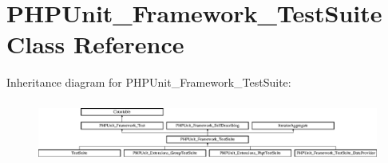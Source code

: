 \hypertarget{class_p_h_p_unit___framework___test_suite}{}\section{P\+H\+P\+Unit\+\_\+\+Framework\+\_\+\+Test\+Suite Class Reference}
\label{class_p_h_p_unit___framework___test_suite}
Inheritance diagram for P\+H\+P\+Unit\+\_\+\+Framework\+\_\+\+Test\+Suite\+:\begin{figure}[H]
\begin{center}
\leavevmode
\includegraphics[height=2.028986cm]{class_p_h_p_unit___framework___test_suite}
\end{center}
\end{figure}
